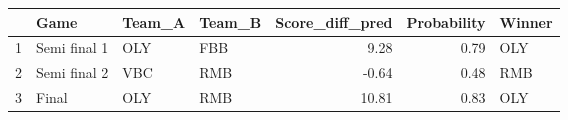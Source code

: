 \begin{table}[ht]
\centering
\begin{tabular}{rlllrrl}
  \hline
 & Game & Team\_A & Team\_B & Score\_diff\_pred & Probability & Winner \\ 
  \hline
1 & Semi final 1 & OLY & FBB & 9.28 & 0.79 & OLY \\ 
  2 & Semi final 2 & VBC & RMB & -0.64 & 0.48 & RMB \\ 
  3 & Final & OLY & RMB & 10.81 & 0.83 & OLY \\ 
   \hline
\end{tabular}
\end{table}

